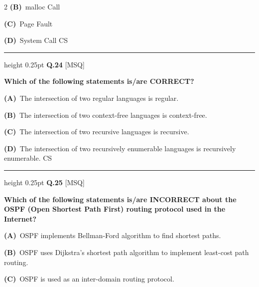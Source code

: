 \documentclass[a4paper,10pt,twoside]{article}
\begin{document}
\begin{multicols}{2}
\textbf{(B)}~malloc Call\par\vspace{2pt}\noindent
\textbf{(C)}~Page Fault\par\vspace{2pt}\noindent
\textbf{(D)}~System Call \newline CS
\par\vspace{6pt}\hrule height 0.25pt\vspace{6pt}
\noindent\textbf{Q.24} \hfill {\footnotesize\textsf{[MSQ]}}
\par\vspace{2pt}
{\bfseries Which of the following statements is/are CORRECT? \par}
\par\vspace{2pt}\noindent
\textbf{(A)}~The intersection of two regular languages is regular.\par\vspace{2pt}\noindent
\textbf{(B)}~The intersection of two context-free languages is context-free.\par\vspace{2pt}\noindent
\textbf{(C)}~The intersection of two recursive languages is recursive.\par\vspace{2pt}\noindent
\textbf{(D)}~The intersection of two recursively enumerable languages is recursively enumerable. \newline CS
\par\vspace{6pt}\hrule height 0.25pt\vspace{6pt}
\noindent\textbf{Q.25} \hfill {\footnotesize\textsf{[MSQ]}}
\par\vspace{2pt}
{\bfseries Which of the following statements is/are INCORRECT about
the OSPF (Open Shortest Path First) routing protocol used in the Internet? \par}
\par\vspace{2pt}\noindent
\textbf{(A)}~OSPF implements Bellman-Ford algorithm to ﬁnd shortest paths.\par\vspace{2pt}\noindent
\textbf{(B)}~OSPF uses Dijkstra's shortest path algorithm to implement least-cost path routing.\par\vspace{2pt}\noindent
\textbf{(C)}~OSPF is used as an inter-domain routing protocol.\par\vspace{2pt}\noindent

\end{multicols}
\end{document}

